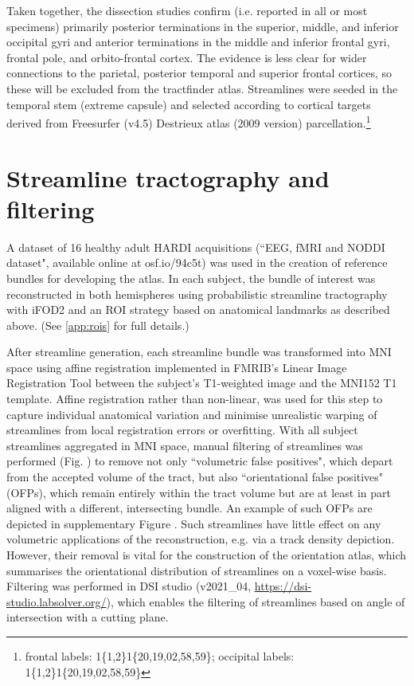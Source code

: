 Taken together, the dissection studies confirm (i.e. reported in all or most specimens) primarily posterior terminations in the superior, middle, and inferior occipital gyri and anterior terminations in the middle and inferior frontal gyri, frontal pole, and orbito-frontal cortex.
The evidence is less clear for wider connections to the parietal, posterior temporal and superior frontal cortices, so these will be excluded from the tractfinder atlas.
Streamlines were seeded in the temporal stem (extreme capsule) and selected according to cortical targets derived from Freesurfer (v4.5) Destrieux atlas\autocite{Destrieux2010} (2009 version) parcellation.\footnote{frontal labels: 1\{1,2\}1\{20,19,02,58,59\}; occipital labels: 1\{1,2\}1\{20,19,02,58,59\}}

\section{Streamline tractography and filtering}

A dataset of 16 healthy adult HARDI acquisitions (``EEG, fMRI and NODDI dataset",\autocite{Clayden2020} available online at osf.io/94c5t) was used in the creation of reference bundles for developing the atlas.
In each subject, the bundle of interest was reconstructed in both hemispheres using probabilistic streamline tractography with iFOD2 \autocite{Tournier2010} and an ROI strategy based on anatomical landmarks as described above. (See \ref{app:rois} for full details.)

After streamline generation, each streamline bundle was transformed into MNI space using affine registration implemented in FMRIB's Linear Image Registration Tool\autocite{Jenkinson2002} between the subject's T1-weighted image and the MNI152 T1 template.\autocite{Fonov2011}
Affine registration rather than non-linear, was used for this step to capture individual anatomical variation and minimise unrealistic warping of streamlines from local registration errors or overfitting.
With all subject streamlines aggregated in MNI space, manual filtering of streamlines was performed (Fig. ) to remove not only ``volumetric false positives", which depart from the accepted volume of the tract, but also ``orientational false positives" (OFPs), which remain entirely within the tract volume but are at least in part aligned with a different, intersecting bundle.
An example of such OFPs are depicted in supplementary Figure . Such streamlines have little effect on any volumetric applications of the reconstruction, e.g. via a track density depiction.
However, their removal is vital for the construction of the orientation atlas, which summarises the orientational distribution of streamlines on a voxel-wise basis.
Filtering was performed in DSI studio (v2021\_04, \url{https://dsi-studio.labsolver.org/})\autocite{Yeh2021a}, which enables the filtering of streamlines based on angle of intersection with a cutting plane.

